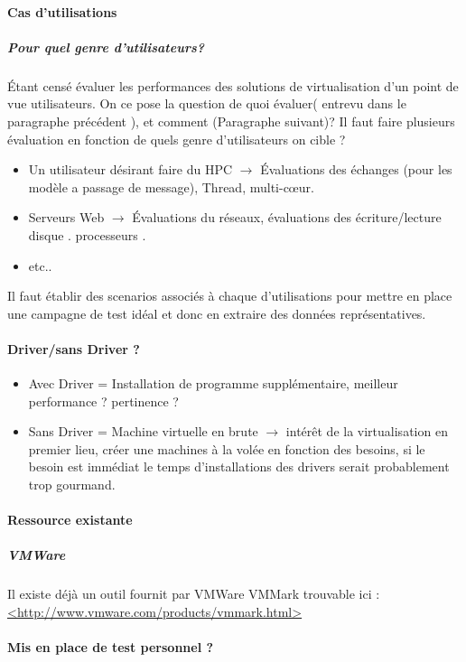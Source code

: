 \documentclass[french]{article}
\begin{document}
\paragraph{Cas d'utilisations}
\subparagraph{Pour quel genre d'utilisateurs?}
Étant censé évaluer les performances des solutions de virtualisation d'un point de vue utilisateurs.
On ce pose la question de quoi évaluer( entrevu dans le paragraphe précédent  ), et comment (Paragraphe suivant)? Il faut faire plusieurs évaluation en fonction de quels genre d'utilisateurs on cible ? 
\begin{itemize}
	\item Un utilisateur désirant faire du HPC $\rightarrow$ Évaluations des échanges (pour les modèle a passage de message), Thread, multi-cœur.
	\item Serveurs Web $\rightarrow$ Évaluations du réseaux, évaluations des écriture/lecture disque . processeurs .
	\item etc.. 
\end{itemize}
Il faut établir des scenarios associés à chaque d'utilisations pour mettre en place une campagne de test idéal et donc en extraire des données représentatives. 
\paragraph{Driver/sans Driver ? }
\begin{itemize}
	\item Avec Driver = Installation de programme supplémentaire, meilleur performance ? pertinence ? 
	\item Sans Driver = Machine virtuelle en brute $\rightarrow$ intérêt de la virtualisation en premier lieu, créer une machines à la volée en fonction des besoins, si le besoin est immédiat le temps d'installations des drivers serait probablement trop gourmand.  
\end{itemize}
\paragraph{Ressource existante }
\subparagraph{VMWare}
	Il existe déjà un outil fournit par VMWare VMMark trouvable ici : \newline
	\url{<http://www.vmware.com/products/vmmark.html>}
\paragraph{Mis en place de test personnel ?}
\end{document}
